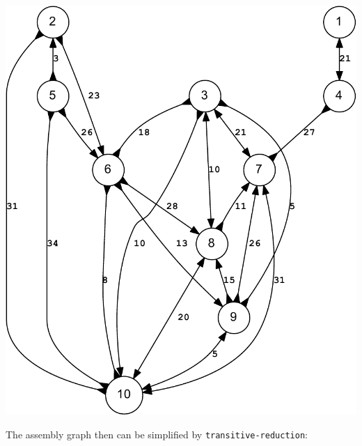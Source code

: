 \documentclass[10pt]{article}
\newcommand{\ProgramName}[1]{{\tt #1}}
\begin{document}
\begin{center}
	\includegraphics[scale=0.7]{example_200bp.bidigraph-crop.pdf}	
\end{center}

The assembly graph then can be simplified by \ProgramName{transitive-reduction}:
\end{document}
